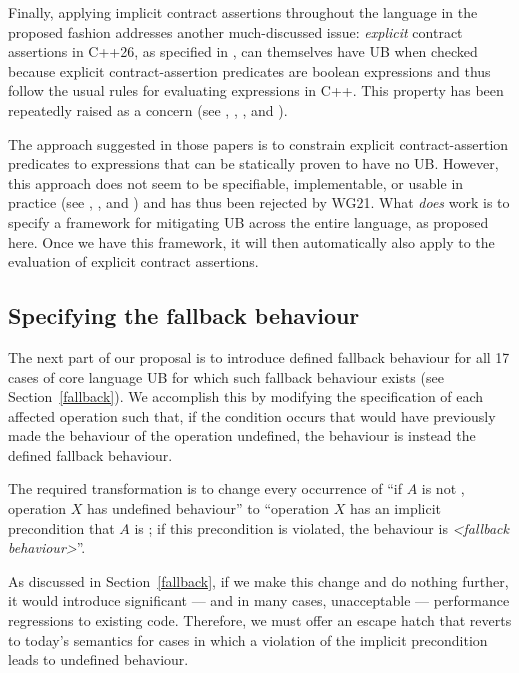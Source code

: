 Finally, applying implicit contract assertions throughout the language in the proposed fashion addresses another much-discussed issue: \emph{explicit} contract assertions in C++26, as specified in \cite{P2900R14}, can themselves have UB when checked because explicit contract-assertion predicates are boolean expressions and thus follow the usual rules for evaluating expressions in C++. This property has been repeatedly raised as a concern (see \cite{P2680R1}, \cite{P3173R0}, \cite{P3285R0}, and \cite{P3362R0}).

The approach suggested in those papers is to constrain explicit contract-assertion predicates to expressions that can be statically proven to have no UB. However, this approach does not seem to be specifiable, implementable, or usable in practice (see  \cite{P3376R0}, \cite{P3386R0}, and \cite{P3499R1}) and has thus been rejected by WG21. What \emph{does} work is to specify a framework for mitigating UB across the entire language, as proposed here. Once we have this framework, it will then automatically also apply to the evaluation of explicit contract assertions.

\subsection{Specifying the fallback behaviour}
\label{specifyfallback}

The next part of our proposal is to introduce defined fallback behaviour for all 17 cases of core language UB for which such fallback behaviour exists (see Section~\ref{fallback}). We accomplish this by modifying the specification of each affected operation such that, if the condition occurs that would have previously made the behaviour of the operation undefined, the behaviour is instead the defined fallback behaviour.

The required transformation is to change every occurrence of “if $A$ is not , operation $X$ has undefined behaviour'' to ``operation $X$ has an implicit precondition that $A$ is ; if this precondition is violated, the behaviour is \emph{<fallback behaviour>}''.

As discussed in Section~\ref{fallback}, if we make this change and do nothing further, it would introduce significant --- and in many cases, unacceptable --- performance regressions to existing code. Therefore, we must offer an escape hatch that reverts to today's semantics for cases in which a violation of the implicit precondition leads to undefined behaviour.

